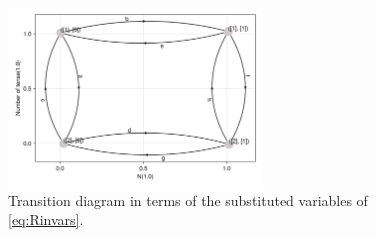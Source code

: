 \documentclass[11pt]{article}
\begin{document}
\begin{figure}[H]
	\centering
	\includegraphics[width=0.6\textwidth]{../../plots/symalph_B=1_C=2_N=1_version=2.5.png}
	\caption{
		Transition diagram in terms of the substituted variables of \cref{eq:Rinvars}.
	}\label{fig:N1symalph}
\end{figure}
\end{document}
